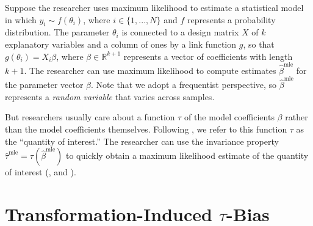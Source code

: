 \documentclass[10pt]{article}
\begin{document}
\thispagestyle{empty}

\onehalfspace

Suppose the researcher uses maximum likelihood to estimate a statistical model in which $y_i \sim f(\theta_i)$, where $i \in \{1,..., N\}$ and $f$ represents a probability distribution. 
The parameter $\theta_i$ is connected to a design matrix $X$ of $k$ explanatory variables and a column of ones by a link function $g$, so that $g(\theta_i) = X_i\beta$, where $\beta \in \mathbb{R}^{k+1}$ represents a vector of coefficients with length $k + 1$. 
The researcher can use maximum likelihood to compute estimates $\hat{\beta}^{\text{mle}}$ for the parameter vector $\beta$.
Note that we adopt a frequentist perspective, so $\hat{\beta}^{\text{mle}}$ represents a \emph{random variable} that varies across samples.

But researchers usually care about a function $\tau$ of the model coefficients $\beta$ rather than the model coefficients themselves. 
Following \cite{KingTomzWittenberg2000}, we refer to this function $\tau$ as the ``quantity of interest.''
The researcher can use the invariance property $\hat{\tau}^{\text{mle}} = \tau \left( \hat{\beta}^{\text{mle}}\right)$ to quickly obtain a maximum likelihood estimate of the quantity of interest (\citealt[pp. 75-76]{King1989}, and \citealt[pp. 320-321]{CasellaBerger2002}).

\section*{Transformation-Induced $\tau$-Bias}
\end{document}
